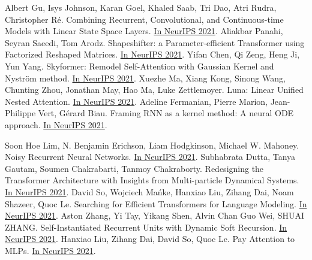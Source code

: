\documentclass[b5paper,xelatex,ja=standard,10pt]{bxjsarticle}
\begin{document}
\begin{thebibliography}{99}
     Albert Gu, Isys Johnson, Karan Goel, Khaled Saab, Tri Dao, Atri Rudra, Christopher Ré. Combining Recurrent, Convolutional, and Continuous-time Models with Linear State Space Layers. {\href{https://proceedings.neurips.cc/paper/2021/hash/05546b0e38ab9175cd905eebcc6ebb76-Abstract.html}{In NeurIPS 2021}}.
     Aliakbar Panahi, Seyran Saeedi, Tom Arodz. Shapeshifter: a Parameter-efficient Transformer using Factorized Reshaped Matrices. {\href{https://proceedings.neurips.cc/paper/2021/hash/09def3ebbc44ff3426b28fcd88c83554-Abstract.html}{In NeurIPS 2021}}.
     Yifan Chen, Qi Zeng, Heng Ji, Yun Yang. Skyformer: Remodel Self-Attention with Gaussian Kernel and Nyström method. {\href{https://proceedings.neurips.cc/paper/2021/hash/10a7cdd970fe135cf4f7bb55c0e3b59f-Abstract.html}{In NeurIPS 2021}}.
     Xuezhe Ma, Xiang Kong, Sinong Wang, Chunting Zhou, Jonathan May, Hao Ma, Luke Zettlemoyer. Luna: Linear Unified Nested Attention. {\href{https://proceedings.neurips.cc/paper/2021/hash/14319d9cfc6123106878dc20b94fbaf3-Abstract.html}{In NeurIPS 2021}}.
     Adeline Fermanian, Pierre Marion, Jean-Philippe Vert, Gérard Biau. Framing RNN as a kernel method: A neural ODE approach. {\href{https://proceedings.neurips.cc/paper/2021/hash/18a9042b3fc5b02fe3d57fea87d6992f-Abstract.html}{In NeurIPS 2021}}.

     Soon Hoe Lim, N. Benjamin Erichson, Liam Hodgkinson, Michael W. Mahoney. Noisy Recurrent Neural Networks. {\href{https://proceedings.neurips.cc/paper/2021/hash/29301521774ff3cbd26652b2d5c95996-Abstract.html}{In NeurIPS 2021}}.
     Subhabrata Dutta, Tanya Gautam, Soumen Chakrabarti, Tanmoy Chakraborty. Redesigning the Transformer Architecture with Insights from Multi-particle Dynamical Systems. {\href{https://proceedings.neurips.cc/paper/2021/hash/2bd388f731f26312bfc0fe30da009595-Abstract.html}{In NeurIPS 2021}}.
     David So, Wojciech Mańke, Hanxiao Liu, Zihang Dai, Noam Shazeer, Quoc Le. Searching for Efficient Transformers for Language Modeling. {\href{https://proceedings.neurips.cc/paper/2021/hash/2f3c6a4cd8af177f6456e7e51a916ff3-Abstract.html}{In NeurIPS 2021}}.
     Aston Zhang, Yi Tay, Yikang Shen, Alvin Chan Guo Wei, SHUAI ZHANG. Self-Instantiated Recurrent Units with Dynamic Soft Recursion. {\href{https://proceedings.neurips.cc/paper/2021/hash/3341f6f048384ec73a7ba2e77d2db48b-Abstract.html}{In NeurIPS 2021}}.
     Hanxiao Liu, Zihang Dai, David So, Quoc Le. Pay Attention to MLPs. {\href{https://proceedings.neurips.cc/paper/2021/hash/4cc05b35c2f937c5bd9e7d41d3686fff-Abstract.html}{In NeurIPS 2021}}.


\end{thebibliography}
\end{document}
